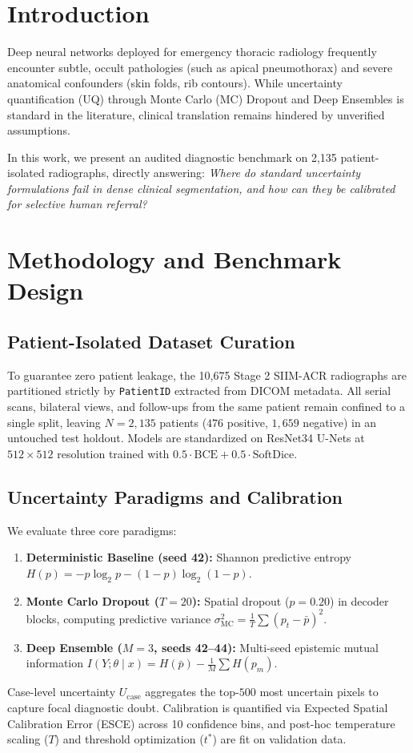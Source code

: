 \documentclass[runningheads]{llncs}
\begin{document}
\section{Introduction}
Deep neural networks deployed for emergency thoracic radiology frequently encounter subtle, occult pathologies (such as apical pneumothorax) and severe anatomical confounders (skin folds, rib contours). While uncertainty quantification (UQ) through Monte Carlo (MC) Dropout \cite{gal2016dropout} and Deep Ensembles \cite{lakshminarayanan2017simple} is standard in the literature, clinical translation remains hindered by unverified assumptions.

In this work, we present an audited diagnostic benchmark on 2,135 patient-isolated radiographs, directly answering: \textit{Where do standard uncertainty formulations fail in dense clinical segmentation, and how can they be calibrated for selective human referral?}

\section{Methodology and Benchmark Design}
\subsection{Patient-Isolated Dataset Curation}
To guarantee zero patient leakage, the 10,675 Stage 2 SIIM-ACR radiographs are partitioned strictly by \texttt{PatientID} extracted from DICOM metadata. All serial scans, bilateral views, and follow-ups from the same patient remain confined to a single split, leaving $N=2,135$ patients ($476$ positive, $1,659$ negative) in an untouched test holdout. Models are standardized on ResNet34 U-Nets at $512 \times 512$ resolution trained with $0.5 \cdot \text{BCE} + 0.5 \cdot \text{SoftDice}$.

\subsection{Uncertainty Paradigms and Calibration}
We evaluate three core paradigms:
\begin{enumerate}
    \item \textbf{Deterministic Baseline (seed 42):} Shannon predictive entropy $H(p) = -p\log_2 p - (1-p)\log_2(1-p)$.
    \item \textbf{Monte Carlo Dropout ($T=20$):} Spatial dropout ($p=0.20$) in decoder blocks, computing predictive variance $\sigma^2_{\text{MC}} = \frac{1}{T}\sum (p_t - \bar{p})^2$.
    \item \textbf{Deep Ensemble ($M=3$, seeds 42--44):} Multi-seed epistemic mutual information $I(Y; \theta \mid x) = H(\bar{p}) - \frac{1}{M}\sum H(p_m)$.
\end{enumerate}
Case-level uncertainty $U_{\text{case}}$ aggregates the top-$500$ most uncertain pixels to capture focal diagnostic doubt. Calibration is quantified via Expected Spatial Calibration Error (ESCE) across 10 confidence bins, and post-hoc temperature scaling ($T$) and threshold optimization ($t^*$) are fit on validation data.
\end{document}
